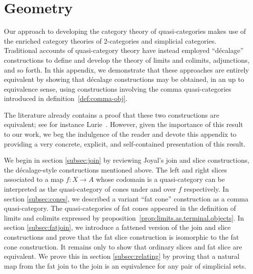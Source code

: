


\section{Geometry}\label{app:geometry}

Our approach to developing the category theory of quasi-categories makes use of the enriched category theories of 2-categories and simplicial categories. Traditional accounts of quasi-category theory have instead employed ``d{\'e}calage'' constructions to define and develop the theory of limits and colimits, adjunctions, and so forth. In this appendix, we demonstrate that these approaches are entirely equivalent by showing that d{\'e}calage constructions may be obtained, in an up to  equivalence sense, using constructions involving the comma quasi-categories introduced in definition~\ref{def:comma-obj}.

The literature already contains a proof that these two constructions are equivalent; see for instance Lurie~\cite[4.2.1.5]{Lurie:2009fk}. However, given the importance of this result to our work, we  beg the indulgence of the reader and devote this appendix to providing a very concrete, explicit, and self-contained presentation of this result.  

  We begin in section \ref{subsec:join} by reviewing Joyal's join and slice constructions, the d{\'e}calage-style constructions mentioned above. The left and right slices associated to a map $f \colon X \to A$ whose codomain is a quasi-category can be interpreted as the quasi-category of cones under and over $f$ respectively. In section \ref{subsec:cones}, we described a variant ``fat cone'' construction as a comma quasi-category. The quasi-categories of fat cones appeared in the definition of limits and colimits expressed by proposition~\ref{prop:limits.as.terminal.objects}. In section \ref{subsec:fatjoin}, we introduce a fattened version of the join and slice constructions and prove that the fat slice construction is isomorphic to the fat cone construction. It remains only to show that ordinary slices and fat slice are equivalent. We prove this in section \ref{subsec:relating} by proving that a natural map from the fat join to the join is an equivalence for any pair of simplicial sets.
 
